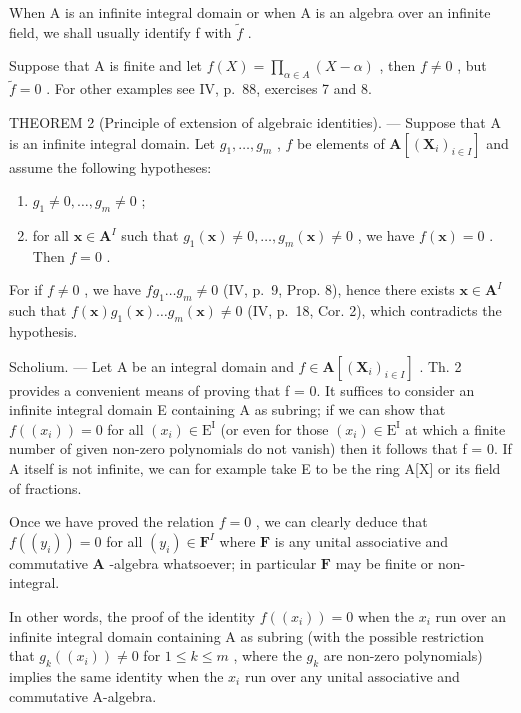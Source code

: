 When A is an infinite integral domain or when A is an algebra over an infinite field, we shall usually identify f with \(\tilde{f}\) .

Suppose that A is finite and let \(f(X) = \prod_{\alpha \in A} (X - \alpha)\) , then \(f \neq 0\) , but \(\tilde{f} = 0\) . For other examples see IV, p.~88, exercises 7 and 8.

THEOREM 2 (Principle of extension of algebraic identities). --- Suppose that A is an infinite integral domain. Let \(g_1, \ldots, g_m\) , \(f\) be elements of \(\mathbf{A}[(\mathbf{X}_i)_{i \in I}]\) and assume the following hypotheses:

\begin{enumerate}
\def\labelenumi{\alph{enumi})}
\item
  \(g_{1} \neq 0, \ldots, g_{m} \neq 0\) ;
\item
  for all \(\mathbf{x} \in \mathbf{A}^{I}\) such that \(g_1(\mathbf{x}) \neq 0, \ldots, g_m(\mathbf{x}) \neq 0\) , we have \(f(\mathbf{x}) = 0\) . Then \(f = 0\) .
\end{enumerate}

For if \(f \neq 0\) , we have \(fg_1 \ldots g_m \neq 0\) (IV, p.~9, Prop. 8), hence there exists \(\mathbf{x} \in \mathbf{A}^{I}\) such that \(f(\mathbf{x})g_1(\mathbf{x}) \ldots g_m(\mathbf{x}) \neq 0\) (IV, p.~18, Cor. 2), which contradicts the hypothesis.

Scholium. --- Let A be an integral domain and \(f \in \mathbf{A}[(\mathbf{X}_i)_{i \in I}]\) . Th. 2 provides a convenient means of proving that f = 0. It suffices to consider an infinite integral domain E containing A as subring; if we can show that \(f((x_i)) = 0\) for all \((x_i) \in \mathrm{E}^{\mathrm{I}}\) (or even for those \((x_i) \in \mathrm{E}^{\mathrm{I}}\) at which a finite number of given non-zero polynomials do not vanish) then it follows that f = 0. If A itself is not infinite, we can for example take E to be the ring A{[}X{]} or its field of fractions.

Once we have proved the relation \(f = 0\) , we can clearly deduce that \(f((y_i)) = 0\) for all \((y_i) \in \mathbf{F}^{I}\) where \(\mathbf{F}\) is any unital associative and commutative \(\mathbf{A}\) -algebra whatsoever; in particular \(\mathbf{F}\) may be finite or non-integral.

In other words, the proof of the identity \(f((x_{i})) = 0\) when the \(x_{i}\) run over an infinite integral domain containing A as subring (with the possible restriction that \(g_{k}((x_{i})) \neq 0\) for \(1 \leqslant k \leqslant m\) , where the \(g_{k}\) are non-zero polynomials) implies the same identity when the \(x_{i}\) run over any unital associative and commutative A-algebra.

